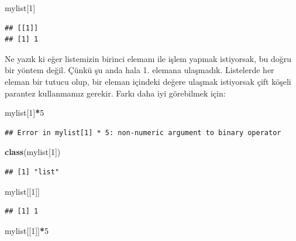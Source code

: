 \documentclass[]{book}
\newenvironment{Shaded}{\begin{snugshade}}{\end{snugshade}}
\newcommand{\DecValTok}[1]{\textcolor[rgb]{0.00,0.00,0.81}{#1}}
\newcommand{\KeywordTok}[1]{\textcolor[rgb]{0.13,0.29,0.53}{\textbf{#1}}}
\newcommand{\NormalTok}[1]{#1}
\newcommand{\OperatorTok}[1]{\textcolor[rgb]{0.81,0.36,0.00}{\textbf{#1}}}
\begin{document}
\begin{Shaded}
\begin{Highlighting}[]
\NormalTok{mylist[}\DecValTok{1}\NormalTok{]}
\end{Highlighting}
\end{Shaded}

\begin{verbatim}
## [[1]]
## [1] 1
\end{verbatim}

Ne yazık ki eğer listemizin birinci elemanı ile işlem yapmak istiyorsak,
bu doğru bir yöntem değil. Çünkü şu anda hala 1. elemana ulaşmadık.
Listelerde her eleman bir tutucu olup, bir eleman içindeki değere
ulaşmak istiyorsak çift köşeli parantez kullanmamız gerekir. Farkı daha
iyi görebilmek için:

\begin{Shaded}
\begin{Highlighting}[]
\NormalTok{mylist[}\DecValTok{1}\NormalTok{]}\OperatorTok{*}\DecValTok{5}
\end{Highlighting}
\end{Shaded}

\begin{verbatim}
## Error in mylist[1] * 5: non-numeric argument to binary operator
\end{verbatim}

\begin{Shaded}
\begin{Highlighting}[]
\KeywordTok{class}\NormalTok{(mylist[}\DecValTok{1}\NormalTok{])}
\end{Highlighting}
\end{Shaded}

\begin{verbatim}
## [1] "list"
\end{verbatim}

\begin{Shaded}
\begin{Highlighting}[]
\NormalTok{mylist[[}\DecValTok{1}\NormalTok{]]}
\end{Highlighting}
\end{Shaded}

\begin{verbatim}
## [1] 1
\end{verbatim}

\begin{Shaded}
\begin{Highlighting}[]
\NormalTok{mylist[[}\DecValTok{1}\NormalTok{]]}\OperatorTok{*}\DecValTok{5}
\end{Highlighting}
\end{Shaded}
\end{document}
